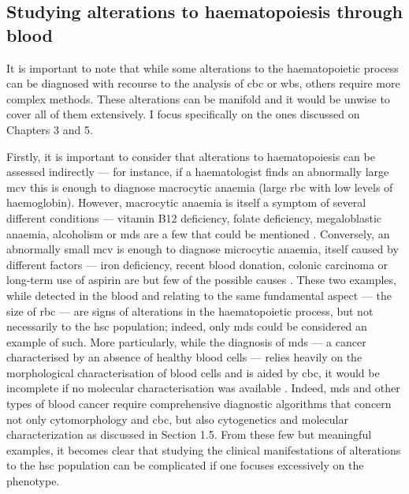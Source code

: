 \subsection{Studying alterations to haematopoiesis through blood}

It is important to note that while some alterations to the haematopoietic process can be diagnosed with recourse to the analysis of \ac{cbc} or \ac{wbs}, others require more complex methods. These alterations can be manifold and it would be unwise to cover all of them extensively. I focus specifically on the ones discussed on Chapters 3 and 5. 

Firstly, it is important to consider that alterations to haematopoiesis can be assessed indirectly --- for instance, if a haematologist finds an abnormally large \ac{mcv} this is enough to diagnose macrocytic anaemia (large \ac{rbc} with low levels of haemoglobin). However, macrocytic anaemia is itself a symptom of several different conditions --- vitamin B12 deficiency, folate deficiency, megaloblastic anaemia, alcoholism or \ac{mds} are a few that could be mentioned \cite{Nagao2017-bx}. Conversely, an abnormally small \ac{mcv} is enough to diagnose microcytic anaemia, itself caused by different factors --- iron deficiency, recent blood donation, colonic carcinoma or long-term use of aspirin are but few of the possible causes \cite{Short2013-pz}. These two examples, while detected in the blood and relating to the same fundamental aspect --- the size of \ac{rbc} --- are signs of alterations in the haematopoietic process, but not necessarily to the \ac{hsc} population; indeed, only \ac{mds} could be considered an example of such. More particularly, while the diagnosis of \ac{mds} --- a cancer characterised by an absence of healthy blood cells --- relies heavily on the morphological characterisation of blood cells and is aided by \ac{cbc}, it would be incomplete if no molecular characterisation was available \cite{Invernizzi2015-ob}. Indeed, \ac{mds} and other types of blood cancer require comprehensive diagnostic algorithms that concern not only cytomorphology and \ac{cbc}, but also cytogenetics and molecular characterization as discussed in Section 1.5. From these few but meaningful examples, it becomes clear that studying the clinical manifestations of alterations to the \ac{hsc} population can be complicated if one focuses excessively on the phenotype.

